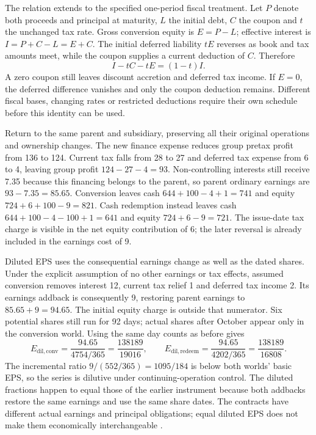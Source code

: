 The relation extends to the specified one-period fiscal treatment. Let $P$
denote both proceeds and principal at maturity, $L$ the initial debt, $C$ the
coupon and $t$ the unchanged tax rate. Gross conversion equity is $E=P-L$;
effective interest is $I=P+C-L=E+C$. The initial deferred liability $tE$
reverses as book and tax amounts meet, while the coupon supplies a current
deduction of $C$. Therefore
\[
 I-tC-tE=(1-t)I.
\]
A zero coupon still leaves discount accretion and deferred tax income. If
$E=0$, the deferred difference vanishes and only the coupon deduction remains.
Different fiscal bases, changing rates or restricted deductions require their
own schedule before this identity can be used.

Return to the same parent and subsidiary, preserving all their original
operations and ownership changes. The new finance expense reduces group
pretax profit from 136 to 124. Current tax falls from 28 to 27 and deferred
tax expense from 6 to 4, leaving group profit $124-27-4=93$.
Non-controlling interests still receive 7.35 because this financing belongs
to the parent, so parent ordinary earnings are $93-7.35=85.65$.
Conversion leaves cash $644+100-4+1=741$ and equity
$724+6+100-9=821$. Cash redemption instead leaves cash
$644+100-4-100+1=641$ and equity $724+6-9=721$.
The issue-date tax charge is visible in the net equity contribution of 6;
the later reversal is already included in the earnings cost of 9.

Diluted EPS uses the consequential earnings change as well as the dated
shares. Under the explicit assumption of no other earnings or tax effects,
assumed conversion removes interest 12, current tax relief 1 and deferred
tax income 2. Its earnings addback is consequently 9, restoring parent
earnings to $85.65+9=94.65$. The initial equity charge is outside that
numerator. Six potential shares still run for 92 days; actual shares after
October appear only in the conversion world. Using the same day counts as
before gives
\[
 E_{\mathrm{dil,conv}}=\frac{94.65}{4754/365}
   =\frac{138189}{19016},\qquad
 E_{\mathrm{dil,redeem}}=\frac{94.65}{4202/365}
   =\frac{138189}{16808}.
\]
The incremental ratio $9/(552/365)=1095/184$ is below both worlds' basic
EPS, so the series is dilutive under continuing-operation control. The
diluted fractions happen to equal those of the earlier instrument because
both addbacks restore the same earnings and use the same share dates.
The contracts have different actual earnings and principal obligations;
equal diluted EPS does not make them economically interchangeable
\citep[IAS~33, paragraphs 32--38 and 41]{eu20231803}.

